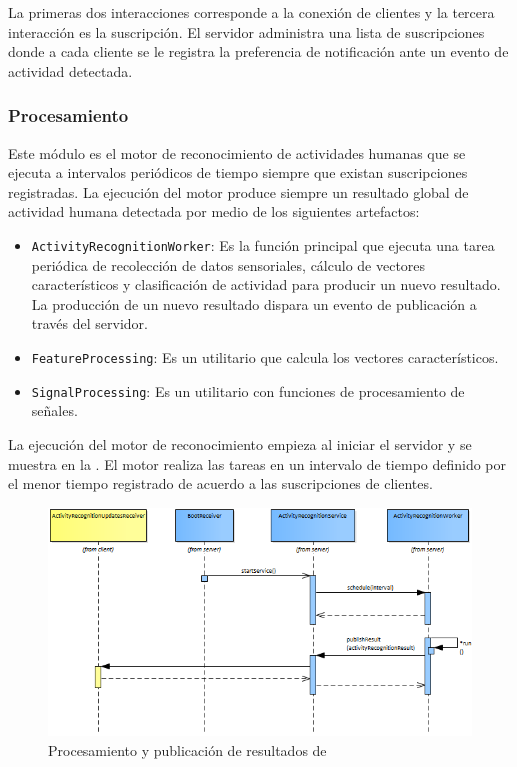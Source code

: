 La primeras dos interacciones corresponde a la conexión de clientes
y la tercera interacción es la suscripción. El servidor administra
una lista de suscripciones donde a cada cliente se le registra la
preferencia de notificación ante un evento de actividad detectada. 

\subsubsection{Procesamiento}

Este módulo es el motor de reconocimiento de actividades humanas que
se ejecuta a intervalos periódicos de tiempo siempre que existan suscripciones
registradas. La ejecución del motor produce siempre un resultado global
de actividad humana detectada por medio de los siguientes artefactos: 
\begin{itemize}
\item \texttt{\small{}ActivityRecognitionWorker}: Es la función principal
que ejecuta una tarea periódica de recolección de datos sensoriales,
cálculo de vectores característicos y clasificación de actividad para
producir un nuevo resultado. La producción de un nuevo resultado dispara
un evento de publicación a través del servidor.
\item \texttt{\small{}FeatureProcessing}: Es un utilitario que calcula los
vectores característicos.
\item \texttt{\small{}SignalProcessing}: Es un utilitario con funciones
de procesamiento de señales. 
\end{itemize}
La ejecución del motor de reconocimiento empieza al iniciar el servidor
y se muestra en la . El motor realiza
las tareas en un intervalo de tiempo definido por el menor tiempo
registrado de acuerdo a las suscripciones de clientes.

\begin{figure}[H]
\begin{centering}
\includegraphics[width=1\columnwidth]{capitulo-5/graphics/service_worker}
\par\end{centering}
\caption[Procesamiento y publicación de resultados de HARDroid]{\label{fig5:service-worker}Procesamiento y publicación de resultados
de }
\end{figure}

